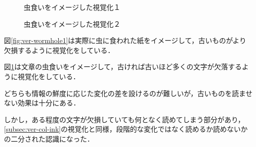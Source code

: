 \begin{figure}[htbp]
  \begin{minipage}{0.5\hsize}
    \begin{center}
    \end{center}
    \caption{虫食いをイメージした視覚化１}
    \label{fig:ver-wormhole1}
  \end{minipage}
  \begin{minipage}{0.5\hsize}
    \begin{center}
    \end{center}
    \caption{虫食いをイメージした視覚化２}
    \label{fig:ver-wormhole2}
  \end{minipage}
\end{figure}

図\ref{fig:ver-wormhole1}は実際に虫に食われた紙をイメージして，古いものがより欠損するように視覚化をしている．

図\ref{fig:ver-wormhole2}は文章の虫食いをイメージして，古ければ古いほど多くの文字が欠落するように視覚化をしている．

どちらも情報の鮮度に応じた変化の差を設けるのが難しいが，古いものを読ませない効果は十分にある．

しかし，ある程度の文字が欠損していても何となく読めてしまう部分があり，\ref{subsec:ver-col-ink}の視覚化と同様，段階的な変化ではなく読めるか読めないかの二分された認識になった．

